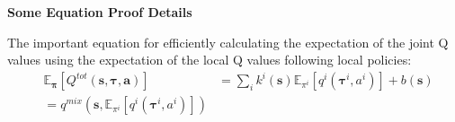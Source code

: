 \documentclass[runningheads]{llncs}
\begin{document}
{\bf Some Equation Proof Details}

The important equation for efficiently calculating the expectation of the joint Q values using the expectation of the local Q values following local policies:
\begin{equation}
	\begin{aligned}
	&\mathbb{E}_{\boldsymbol{\pi}}\left[Q^{t o t}(\boldsymbol{s},\boldsymbol{\tau}, \boldsymbol{a})\right]
	&=\sum_{i} k^{i}(\boldsymbol{s}) \mathbb{E}_{{\pi}^{i}} \left[ q^{i}\left(\boldsymbol{\tau}^{i}, a^{i}\right)\right]+ b(\boldsymbol{s})\\
	&=q^{mix}(\boldsymbol{s},\mathbb{E}_{{\pi}^{i}} \left[ q^{i}\left(\boldsymbol{\tau}^{i}, a^{i}\right)\right])
	\end{aligned}
\end{equation}
\end{document}
